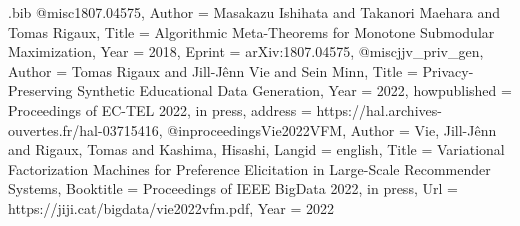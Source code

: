 \RequirePackage{filecontents}
\begin{filecontents*}{\jobname.bib}
@misc{1807.04575,
Author = {Masakazu Ishihata and Takanori Maehara and Tomas Rigaux},
Title = {Algorithmic Meta-Theorems for Monotone Submodular Maximization},
Year = {2018},
Eprint = {arXiv:1807.04575},
}
@misc{jjv_priv_gen,
Author =  {Tomas Rigaux and Jill-Jênn Vie and Sein Minn},
Title =  {Privacy-Preserving Synthetic Educational Data Generation},
Year = {2022},
howpublished = {Proceedings of EC-TEL 2022, in press},
address = {https://hal.archives-ouvertes.fr/hal-03715416},
}
@inproceedings{Vie2022VFM,
    Author = {{Vie}, Jill-J{\^e}nn and Rigaux, Tomas and {Kashima}, Hisashi},
    Langid = {english},
    Title = {Variational Factorization Machines for Preference Elicitation in Large-Scale Recommender Systems},
    Booktitle = {Proceedings of IEEE BigData 2022, in {press}},
    Url = {https://jiji.cat/bigdata/vie2022vfm.pdf},
    Year = 2022}
\end{filecontents*}

\documentclass[11pt,a4paper,sans]{moderncv}        %


\usepackage[utf8]{inputenc}                       %

\usepackage[scale=0.75,left=0.8in,right=0.8in,top=1in,bottom=1.5in]{geometry}


